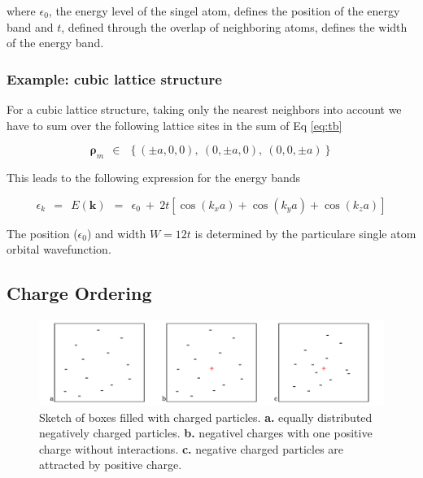 \documentclass[10pt]{report}
\numberwithin{equation}{chapter}
\newcommand{\refEq}[1]{
  Eq  \ref{#1}
}
\begin{document}
where $\epsilon_0$, the energy level of the singel atom, defines the position of the energy band and $t$, defined through the overlap of neighboring atoms, defines the width of the energy band.


\subsubsection{Example: cubic lattice structure}

For a cubic lattice structure, taking only the nearest neighbors into account we have to sum over the following lattice sites in the sum of \refEq{eq:tb}

\begin{equation}
  \mathbf{\rho}_m ~~\in~~ \left\{ (\pm a,0 ,0),~ (0, \pm a, 0),~ (0, 0, \pm a) \right\}
\end{equation}

This leads to the following expression for the energy bands

\begin{equation}
  \epsilon_k ~~=~~ E(\mathbf{k}) ~~=~~ \epsilon_0 ~+~ 2t \left[ \cos(k_xa) + \cos(k_ya) + \cos(k_za) \right]
\end{equation}

The position ($\epsilon_0$) and width $W=12t$ is determined by the particulare single atom orbital wavefunction.


%


\subsection{Charge Ordering}

\begin{figure}
  \centering
  \includegraphics[width=1.0\textwidth]{../img/screening_charge_box.pdf}
  \caption{Sketch of boxes filled with charged particles. \textbf{a.} equally distributed negatively charged particles. \textbf{b.} negativel charges with one positive charge without interactions. \textbf{c.} negative charged particles are attracted by positive charge.}
  \label{fig:screening_charge_box}
\end{figure}
\end{document}
